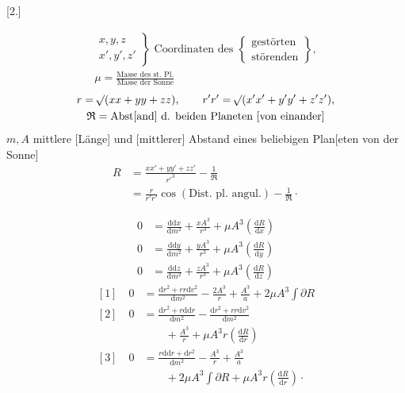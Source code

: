 \par\bigskip
\hypertarget{native-384-ceres2}{}
\begin{center}
[2.]\par
\medskip
{}
\end{center}
\[
\begin{gathered}
\left.\begin{array}{c}x,y,z\\x',y',z'\end{array}\right\}
\text{ Coordinaten des }
\left\{\begin{array}{l}\text{gestörten}\\\text{störenden}\end{array}\right\},\\[4pt]
\mu=\frac{\text{Masse des st. Pl.}}{\text{Masse der Sonne}}
\end{gathered}
\]
\[
\begin{gathered}
r=\mathord{{}^{}\!\surd}(xx+yy+zz),\qquad
r'r'=\mathord{{}^{}\!\surd}(x'x'+y'y'+z'z'),\\
\mathfrak{R}=\text{Abst[and] d. beiden Planeten [von einander]}
\end{gathered}
\]
\noindent\(m,A\) mittlere [Länge] und [mittlerer] Abstand eines beliebigen Plan[eten von der Sonne]
\[
\begin{aligned}
R&=\frac{xx'+yy'+zz'}{r'^{3}}-\frac{1}{\mathfrak{R}}\\
 &=\frac{r}{r'r'}\cos(\text{Dist. pl. angul.})-\frac{1}{\mathfrak{R}}\mathpunct{\cdot}
\end{aligned}
\]
\par\medskip
\noindent\hspace*{\parindent}
\[
\begin{aligned}
0&=\frac{\mathrm{d}\mathrm{d}x}{\mathrm{d}m^{2}}+\frac{xA^{3}}{r^{3}}+\mu A^{3}\left(\frac{\mathrm{d}R}{\mathrm{d}x}\right)\\[4pt]
0&=\frac{\mathrm{d}\mathrm{d}y}{\mathrm{d}m^{2}}+\frac{yA^{3}}{r^{3}}+\mu A^{3}\left(\frac{\mathrm{d}R}{\mathrm{d}y}\right)\\[4pt]
0&=\frac{\mathrm{d}\mathrm{d}z}{\mathrm{d}m^{2}}+\frac{zA^{3}}{r^{3}}+\mu A^{3}\left(\frac{\mathrm{d}R}{\mathrm{d}z}\right)
\end{aligned}
\]
\[
\begin{aligned}
[1]\quad 0&=\frac{\mathrm{d}r^{2}+rr\mathrm{d}v^{2}}{\mathrm{d}m^{2}}-\frac{2A^{3}}{r}+\frac{A^{3}}{a}+2\mu A^{3}\int\partial R\\[6pt]
[2]\quad 0&=\frac{\mathrm{d}r^{2}+r\mathrm{d}\mathrm{d}r}{\mathrm{d}m^{2}}-\frac{\mathrm{d}r^{2}+rr\mathrm{d}v^{2}}{\mathrm{d}m^{2}}\\
&\qquad+\frac{A^{3}}{r}+\mu A^{3}r\left(\frac{\mathrm{d}R}{\mathrm{d}r}\right)\\[6pt]
[3]\quad 0&=\frac{r\mathrm{d}\mathrm{d}r+\mathrm{d}r^{2}}{\mathrm{d}m^{2}}-\frac{A^{3}}{r}+\frac{A^{3}}{a}\\
&\qquad+2\mu A^{3}\int\partial R+\mu A^{3}r\left(\frac{\mathrm{d}R}{\mathrm{d}r}\right)\mathpunct{\cdot}
\end{aligned}
\]

